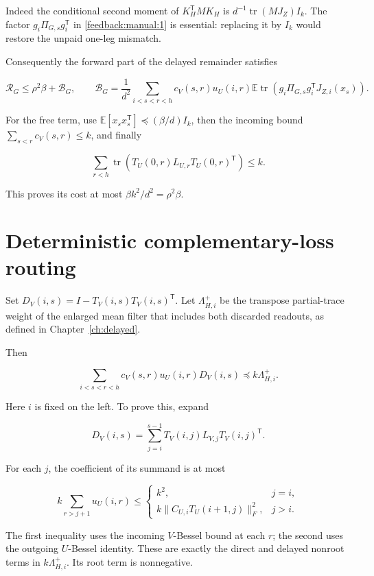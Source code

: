 \documentclass[11pt,oneside,openany,a4paper]{book}
\numberwithin{equation}{chapter}
\theoremstyle{definition}
\theoremstyle{remark}
\begin{document}
Indeed the conditional second moment of \(K_H^{\mathsf T}MK_H\) is \(d^{-1}\operatorname{tr}(MJ_Z)I_k\). The factor \(g_i\Pi_{G,s}g_i^{\mathsf T}\) in \eqref{feedback:manual:1} is essential: replacing it by \(I_k\) would restore the unpaid one-leg mismatch.

Consequently the forward part of the delayed remainder satisfies

\[
\mathcal R_G\le\rho^2\beta+\mathcal B_G,
\qquad
\mathcal B_G=\frac1{d^2}\sum_{i<s<r<h}c_V(s,r)u_U(i,r)
\mathbb E\operatorname{tr}\!\left(g_i\Pi_{G,s}g_i^{\mathsf T}J_{Z,i}(x_s)\right).
\tag{\thechapter.2}\label{feedback:manual:2}
\]

For the free term, use \(\mathbb E[x_sx_s^{\mathsf T}]\preceq(\beta/d)I_k\), then the incoming bound \(\sum_{s<r}c_V(s,r)\le k\), and finally

\[
\sum_{r<h}\operatorname{tr}\!\left(T_U(0,r)L_{U,r}T_U(0,r)^{\mathsf T}\right)\le k.
\]

This proves its cost at most \(\beta k^2/d^2=\rho^2\beta\).

\section{Deterministic complementary-loss routing}\label{feedback:deterministic-complementary-loss-routing}

Set \(D_V(i,s)=I-T_V(i,s)T_V(i,s)^{\mathsf T}\). Let \(\Lambda^+_{H,i}\) be the transpose partial-trace weight of the enlarged mean filter that includes both discarded readouts, as defined in Chapter~\ref{ch:delayed}.

Then

\[
\boxed{\displaystyle
\sum_{i<s<r<h}c_V(s,r)u_U(i,r)D_V(i,s)
\preceq k\Lambda^+_{H,i}.}\tag{\thechapter.3}\label{feedback:manual:3}
\]

Here \(i\) is fixed on the left. To prove this, expand

\[
D_V(i,s)=\sum_{j=i}^{s-1}T_V(i,j)L_{V,j}T_V(i,j)^{\mathsf T}.
\]

For each \(j\), the coefficient of its summand is at most

\[
k\sum_{r>j+1}u_U(i,r)
\le\begin{cases}k^2,&j=i,\\
k\|C_{U,i}T_U(i+1,j)\|_F^2,&j>i.
\end{cases}
\]

The first inequality uses the incoming \(V\)-Bessel bound at each \(r\); the second uses the outgoing \(U\)-Bessel identity. These are exactly the direct and delayed nonroot terms in \(k\Lambda^+_{H,i}\). Its root term is nonnegative.
\end{document}
